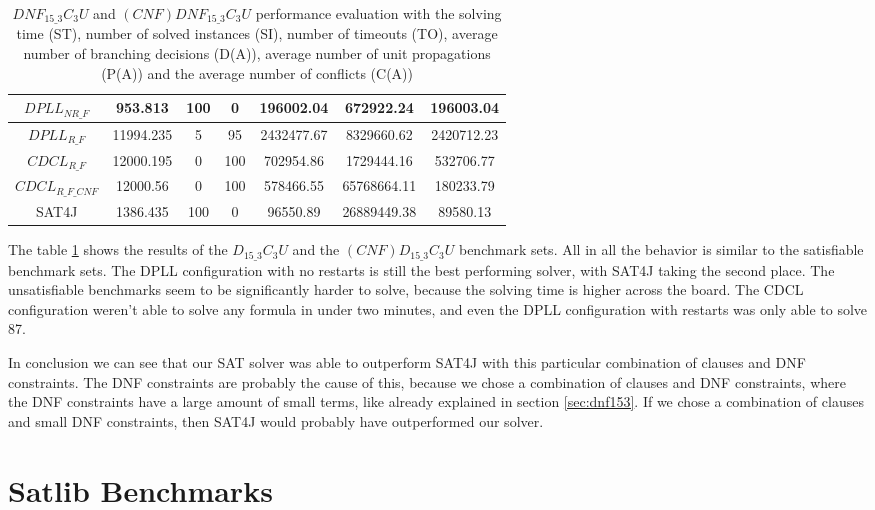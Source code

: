 \begin{table}[!htb]
\centering
\caption[$DNF_{15\_3}C_3U$ and $(CNF)DNF_{15\_3}C_3U$ performance evaluation]{$DNF_{15\_3}C_3U$ and $(CNF)DNF_{15\_3}C_3U$ performance evaluation with the solving time (ST), number of solved instances (SI), number of timeouts (TO), average number of branching decisions (D(A)), average number of unit propagations (P(A)) and the average number of conflicts (C(A))}
\label{tab:dnfClauseBenchmarkUNSAT}
\begin{tabular}{|c|c|c|c|c|c|c|}
\hline
$DPLL_{NR\_F}$ & 953.813 & 100 & 0 & 196002.04 & 672922.24 & 196003.04 \\ 
\hline
$DPLL_{R\_F}$ & 11994.235 & 5 & 95 & 2432477.67 & 8329660.62 & 2420712.23 \\ 
\hline
$CDCL_{R\_F}$ & 12000.195 & 0 & 100 & 702954.86 & 1729444.16 & 532706.77 \\ 
\hline
$CDCL_{R\_F\_CNF}$ & 12000.56 & 0 & 100 & 578466.55 & 65768664.11 & 180233.79 \\ 
\hline
SAT4J & 1386.435 & 100 & 0 & 96550.89 & 26889449.38 & 89580.13 \\ 
\hline
\end{tabular}
\end{table}

The table \ref{tab:dnfClauseBenchmarkUNSAT} shows the results of the $D_{15\_3}C_3U$ and the $(CNF)D_{15\_3}C_3U$ benchmark sets. All in all the behavior is similar to the satisfiable benchmark sets. The DPLL configuration with no restarts is still the best performing solver, with SAT4J taking the second place. The unsatisfiable benchmarks seem to be significantly harder to solve, because the solving time is higher across the board. The CDCL configuration weren't able to solve any formula in under two minutes, and even the DPLL configuration with restarts was only able to solve 87.

In conclusion we can see that our SAT solver was able to outperform SAT4J with this particular combination of clauses and DNF constraints. The DNF constraints are probably the cause of this, because we chose a combination of clauses and DNF constraints, where the DNF constraints have a large amount of small terms, like already explained in section \ref{sec:dnf153}. If we chose a combination of clauses and small DNF constraints, then SAT4J would probably have outperformed our solver.

\section{Satlib Benchmarks}


